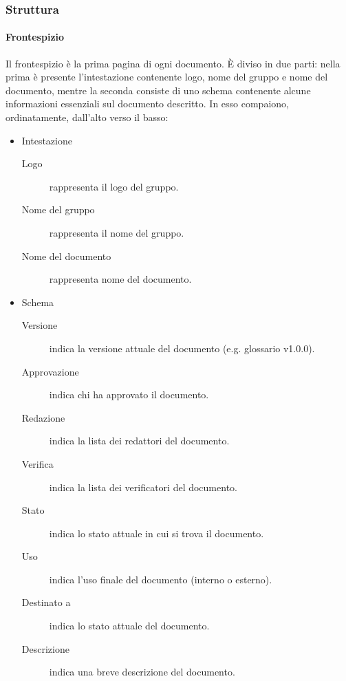\documentclass[../norme-di-progetto.tex]{subfiles}
\begin{document}
\subsubsection{Struttura}%
\label{subs:struttura}

\paragraph{Frontespizio}%
\label{par:frontespizio}
Il frontespizio è la prima pagina di ogni documento. È diviso in due parti: nella prima è presente l'intestazione contenente logo, nome del gruppo e nome del documento, mentre la seconda consiste di uno schema contenente alcune informazioni essenziali sul documento descritto. In esso compaiono, ordinatamente, dall'alto verso il basso:

\begin{itemize}
  \item Intestazione
        \begin{description}
          \item [Logo] rappresenta il logo del gruppo.
          \item [Nome del gruppo] rappresenta il nome del gruppo.
          \item [Nome del documento] rappresenta nome del documento.
        \end{description}
  \item Schema
        \begin{description}
          \item [Versione] indica la versione attuale del documento (e.g\@. glossario v1.0.0).
          \item [Approvazione] indica chi ha approvato il documento.
          \item [Redazione] indica la lista dei redattori del documento.
          \item [Verifica] indica la lista dei verificatori del documento.
          \item [Stato] indica lo stato attuale in cui si trova il documento.
          \item [Uso] indica l'uso finale del documento (interno o esterno).
          \item [Destinato a] indica lo stato attuale del documento.
          \item [Descrizione] indica una breve descrizione del documento.
        \end{description}
\end{itemize}
\end{document}
